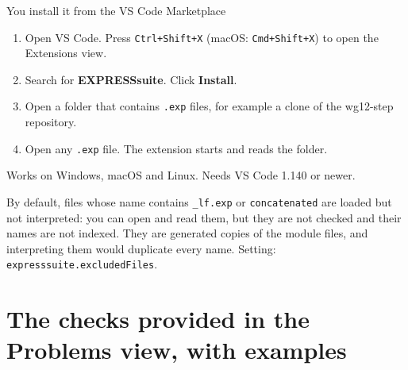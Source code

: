 \documentclass[11pt]{beamer}
\newcommand{\code}[1]{\texttt{#1}}
\begin{document}
\begin{frame}{You install it from the VS Code Marketplace}
  \begin{enumerate}
    \item Open VS Code. Press \code{Ctrl+Shift+X} (macOS: \code{Cmd+Shift+X}) to open the Extensions view.
    \item Search for \textbf{EXPRESSsuite}. Click \textbf{Install}.
    \item Open a folder that contains \code{.exp} files, for example a clone of the wg12-step repository.
    \item Open any \code{.exp} file. The extension starts and reads the folder.
  \end{enumerate}
  \medskip
  Works on Windows, macOS and Linux. Needs VS Code 1.140 or newer.
  \medskip

  \footnotesize\color{sc4grey}
  By default, files whose name contains \code{\_lf.exp} or \code{concatenated} are loaded
  but not interpreted: you can open and read them, but they are not checked and their
  names are not indexed. They are generated copies of the module files, and interpreting
  them would duplicate every name. Setting: \code{expresssuite.excludedFiles}.
\end{frame}


\section{The checks provided in the Problems view, with examples}
\end{document}

